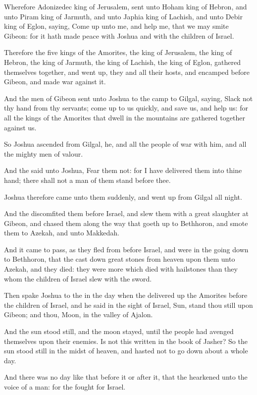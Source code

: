 \verse Wherefore Adonizedec king of Jerusalem, sent unto Hoham king of Hebron, and unto Piram king of Jarmuth, and unto Japhia king of Lachish, and unto Debir king of Eglon, saying, \verse Come up unto me, and help me, that we may smite Gibeon: for it hath made peace with Joshua and with the children of Israel.

\verse Therefore the five kings of the Amorites, the king of Jerusalem, the king of Hebron, the king of Jarmuth, the king of Lachish, the king of Eglon, gathered themselves together, and went up, they and all their hosts, and encamped before Gibeon, and made war against it.

\verse And the men of Gibeon sent unto Joshua to the camp to Gilgal, saying, Slack not thy hand from thy servants; come up to us quickly, and save us, and help us: for all the kings of the Amorites that dwell in the mountains are gathered together against us.

\verse So Joshua ascended from Gilgal, he, and all the people of war with him, and all the mighty men of valour.

\verse And the \LORD said unto Joshua, Fear them not: for I have delivered them into thine hand; there shall not a man of them stand before thee.

\verse Joshua therefore came unto them suddenly, and went up from Gilgal all night.

\verse And the \LORD discomfited them before Israel, and slew them with a great slaughter at Gibeon, and chased them along the way that goeth up to Bethhoron, and smote them to Azekah, and unto Makkedah.

\verse And it came to pass, as they fled from before Israel, and were in the going down to Bethhoron, that the \LORD cast down great stones from heaven upon them unto Azekah, and they died: they were more which died with hailstones than they whom the children of Israel slew with the sword.

\verse Then spake Joshua to the \LORD in the day when the \LORD delivered up the Amorites before the children of Israel, and he said in the sight of Israel, Sun, stand thou still upon Gibeon; and thou, Moon, in the valley of Ajalon.

\verse And the sun stood still, and the moon stayed, until the people had avenged themselves upon their enemies. Is not this written in the book of Jasher? So the sun stood still in the midst of heaven, and hasted not to go down about a whole day.

\verse And there was no day like that before it or after it, that the \LORD hearkened unto the voice of a man: for the \LORD fought for Israel.

